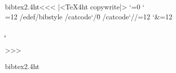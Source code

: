 \documentclass{article}
\begin{document}



\<bibtex2.4ht\><<<
|<TeX4ht copywrite|>
\catcode`\/=0
\catcode`\\=12
/edef/bibstyle{\bibstyle}
/catcode`/\=0
/catcode`//=12
\catcode`\&=12

\def\get{%
  \immediate\read15 to \line
  \ifeof15 \else
     \expandafter\scan\line @@@@@@@@@&&&&
     \expandafter\get
  \fi
}
\def\scan#1#2#3#4#5#6#7#8#9{\def\first{#1#2#3#4#5#6#7#8#9}\put}
\def\put#1&&&&{%
    \immediate\write15{\ifx \first\bibstyle 
           \ifx \style\empty \line \else \bibstyle{\style}\fi
        \else  \line\fi}}
\newcount\c
\def\Cats#1#2#3{\edef\temp{\the\c}%
  \c=#3
  \def\next{\catcode\c=#1
    \ifnum \c=#2 \let\next=\relax \fi
    \advance\c by  -1 \next}\next
  \c=\temp  }

\def\jaux#1#2{%
  \bgroup
    \def\style{#2}%
    \immediate\openin15=#1.aux
    \ifeof15 \else
      \Cats{12}{0}{255}%
      \Cats{11}{65}{90}%
      \Cats{11}{97}{122}%
      \catcode`\^^M=5
      \immediate\openout15=#1j.aux
      \get
      \immediate\write15{}
      \closeout15
    \fi
  \egroup
}


>>>



  \OutputCodE\<bibtex2.4ht\>
\end{document}
